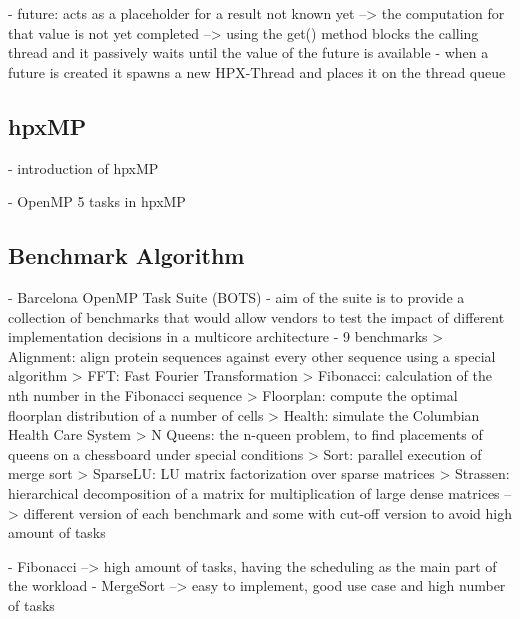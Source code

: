   - future: acts as a placeholder for a result not known yet
    --> the computation for that value is not yet completed
    --> using the get() method blocks the calling thread and it passively waits until the value of the future is available
    - when a future is created it spawns a new HPX-Thread and places it on the thread queue


\subsection{hpxMP}
\cite{TianyiZhang.2019}
- introduction of hpxMP

\cite{Zhang.2192020}
- OpenMP 5 tasks in hpxMP


    
\subsection{Benchmark Algorithm}
- Barcelona OpenMP Task Suite (BOTS)
	- aim of the suite is to provide a collection of benchmarks that would allow vendors to test the impact of different implementation decisions in a multicore architecture
	- 9 benchmarks
		> Alignment: align protein sequences against every other sequence using a special algorithm
		> FFT: Fast Fourier Transformation
		> Fibonacci: calculation of the nth number in the Fibonacci sequence
		> Floorplan: compute the optimal floorplan distribution of a number of cells
		> Health: simulate the Columbian Health Care System
		> N Queens: the n-queen problem, to find placements of queens on a chessboard under special conditions
		> Sort: parallel execution of merge sort
		> SparseLU: LU matrix factorization over sparse matrices
		> Strassen: hierarchical decomposition of a matrix for multiplication of large dense matrices
	--> different version of each benchmark and some with cut-off version to avoid high amount of tasks
	

	- Fibonacci --> high amount of tasks, having the scheduling as the main part of the workload
	- MergeSort --> easy to implement, good use case and high number of tasks
	
